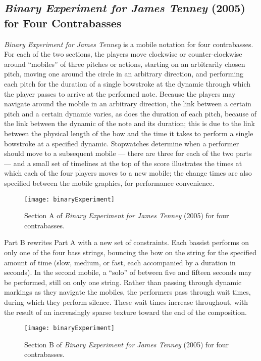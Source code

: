 \subsection{\emph{Binary Experiment for James Tenney} (2005) for Four Contrabasses}

\emph{Binary Experiment for James Tenney} is a mobile notation for four contrabasses. For each of the two sections, the players move clockwise or counter-clockwise around ``mobiles'' of three pitches or actions, starting on an arbitrarily chosen pitch, moving one around the circle in an arbitrary direction, and performing each pitch for the duration of a single bowstroke at the dynamic through which the player passes to arrive at the performed note. Because the players may navigate around the mobile in an arbitrary direction, the link between a certain pitch and a certain dynamic varies, as does the duration of each pitch, because of the link between the dynamic of the note and its duration; this is due to the link between the physical length of the bow and the time it takes to perform a single bowstroke at a specified dynamic. Stopwatches determine when a performer should move to a subsequent mobile --- there are three for each of the two parts --- and a small set of timelines at the top of the score illustrates the times at which each of the four players moves to a new mobile; the change times are also specified between the mobile graphics, for performance convenience.

\begin{figure}[H] 
\texttt{[image: binaryExperiment]}
\caption{Section A of \emph{Binary Experiment for James Tenney} (2005) for four contrabasses. } 
\end{figure}

Part B rewrites Part A with a new set of constraints. Each bassist performs on only one of the four bass strings, bouncing the bow on the string for the specified amount of time (slow, medium, or fast, each accompanied by a duration in seconds). In the second mobile, a ``solo'' of between five and fifteen seconds may be performed, still on only one string. Rather than passing through dynamic markings as they navigate the mobiles, the performers pass through wait times, during which they perform silence. These wait times increase throughout, with the result of an increasingly sparse texture toward the end of the composition. 

\begin{figure}[H] 
\texttt{[image: binaryExperiment]}
\caption{Section B of \emph{Binary Experiment for James Tenney} (2005) for four contrabasses. } 
\end{figure}

